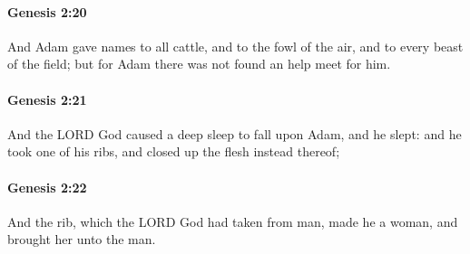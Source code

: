 		\paragraph{Genesis 2:20} %
			\label{GENESIS-2-20}

			And Adam gave names to all cattle, and to the fowl of the air, and to every beast of the field; but for Adam there was not found an help meet for him.


		\paragraph{Genesis 2:21} %
			\label{GENESIS-2-21}

			And the LORD God caused a deep sleep to fall upon Adam, and he slept: and he took one of his ribs, and closed up the flesh instead thereof;


		\paragraph{Genesis 2:22} %
			\label{GENESIS-2-22}

			And the rib, which the LORD God had taken from man, made he a woman, and brought her unto the man.



